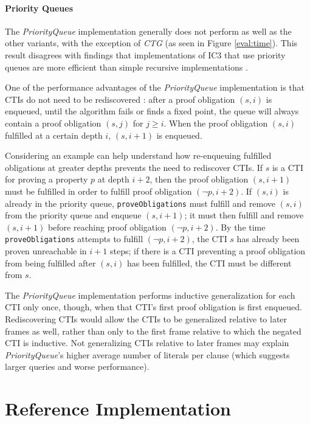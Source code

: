 \documentclass[12pt,a4paper,twoside,openright]{report}
\begin{document}
{{\paragraph{Priority Queues}{
The \emph{PriorityQueue} implementation generally does not perform as well as the
other variants, with the exception of \emph{CTG} (as seen in Figure \ref{eval:time}).
This result disagrees with findings that implementations of IC3 that
use priority queues are more efficient than simple recursive implementations
\cite{een11,griggio14}.

One of the performance advantages of the \emph{PriorityQueue} implementation is that CTIs do not need
to be rediscovered \cite{een11}: after a proof obligation $(s,i)$ is enqueued, until the algorithm fails or finds a fixed point,
the queue will always contain a proof obligation $(s,j)$ for $j \geq i$. When the proof obligation $(s,i)$
fulfilled at a certain depth $i$, $(s,i + 1)$ is enqueued.

Considering an example can help understand how re-enqueuing fulfilled obligations at
greater depths prevents the need to rediscover CTIs.
If $s$ is a CTI for proving a property
$p$ at depth $i + 2$, then the proof obligation $(s, i+1)$ must be fulfilled
in order to fulfill proof obligation $(\neg p, i+2)$. If $(s,i)$ is already
in the priority queue, \verb,proveObligations, must fulfill and
remove $(s,i)$ from the
priority queue and enqueue $(s, i + 1)$; it must then fulfill and remove $(s, i + 1)$ before
reaching proof obligation $(\neg p, i + 2)$. By the time \verb,proveObligations,
attempts to fulfill $(\neg p, i + 2)$, the CTI $s$ has already been proven
unreachable in $i + 1$ steps; if there is a CTI preventing a proof obligation
from being fulfilled after $(s,i)$ has been fulfilled, the CTI must be different
from $s$.

The \emph{PriorityQueue} implementation performs inductive generalization for each CTI only once, though,
when that CTI's first proof obligation is first enqueued. Rediscovering CTIs would allow the CTIs to
be generalized relative to later frames as well, rather than only to the first frame relative to which
the negated CTI is inductive. Not generalizing CTIs relative to later frames may
explain \emph{PriorityQueue}'s higher average number of
literals per clause (which suggests larger queries and worse performance).
}

\section{Reference Implementation}
\label{eval:ic3ref}

}}
\end{document}
